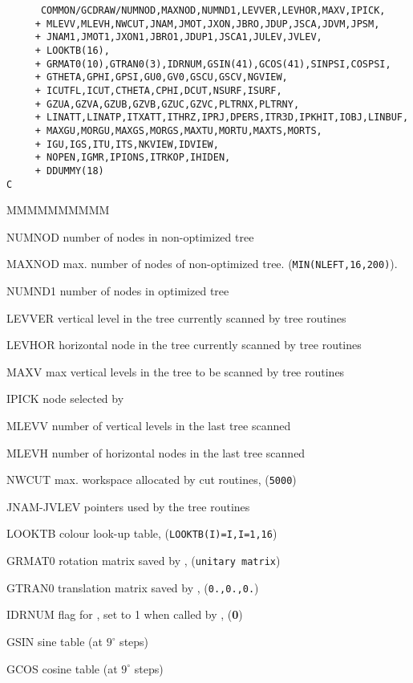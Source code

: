 \begin{verbatim}
      COMMON/GCDRAW/NUMNOD,MAXNOD,NUMND1,LEVVER,LEVHOR,MAXV,IPICK,
     + MLEVV,MLEVH,NWCUT,JNAM,JMOT,JXON,JBRO,JDUP,JSCA,JDVM,JPSM,
     + JNAM1,JMOT1,JXON1,JBRO1,JDUP1,JSCA1,JULEV,JVLEV,
     + LOOKTB(16),
     + GRMAT0(10),GTRAN0(3),IDRNUM,GSIN(41),GCOS(41),SINPSI,COSPSI,
     + GTHETA,GPHI,GPSI,GU0,GV0,GSCU,GSCV,NGVIEW,
     + ICUTFL,ICUT,CTHETA,CPHI,DCUT,NSURF,ISURF,
     + GZUA,GZVA,GZUB,GZVB,GZUC,GZVC,PLTRNX,PLTRNY,
     + LINATT,LINATP,ITXATT,ITHRZ,IPRJ,DPERS,ITR3D,IPKHIT,IOBJ,LINBUF,
     + MAXGU,MORGU,MAXGS,MORGS,MAXTU,MORTU,MAXTS,MORTS,
     + IGU,IGS,ITU,ITS,NKVIEW,IDVIEW,
     + NOPEN,IGMR,IPIONS,ITRKOP,IHIDEN,
     + DDUMMY(18)
C
\end{verbatim}
\begin{DLtt}{MMMMMMMMMM}
\item[NUMNOD] number of nodes in non-optimized tree
\item[MAXNOD] max. number of nodes of non-optimized tree.
({\tt MIN(NLEFT,16,200)}).
\item[NUMND1] number of nodes in optimized tree
\item[LEVVER] vertical level in the tree currently scanned by tree routines
\item[LEVHOR] horizontal node in the tree currently scanned by
tree routines
\item[MAXV] max vertical levels in the tree to be scanned by tree routines
\item[IPICK] node selected by 
\item[MLEVV] number of vertical levels in the last tree scanned
\item[MLEVH] number of horizontal nodes in the last tree scanned
\item[NWCUT] max. workspace allocated by cut routines, ({\tt 5000})
\item[JNAM-JVLEV]  pointers used by the tree routines
\item[LOOKTB] colour look-up table, ({\tt LOOKTB(I)=I,I=1,16})
\item[GRMAT0] rotation matrix saved by , ({\tt unitary matrix})
\item[GTRAN0] translation matrix saved by , ({\tt 0.,0.,0.})
\item[IDRNUM] flag for , set to 1 when called by ,
({\bf 0})
\item[GSIN] sine table (at $9^{\circ}$ steps)
\item[GCOS] cosine table (at $9^{\circ}$ steps)

\end{DLtt}
